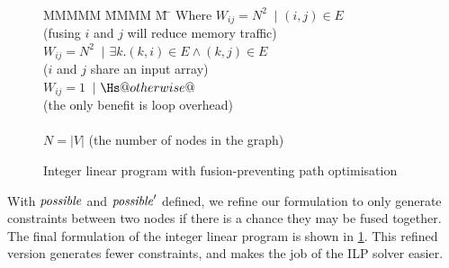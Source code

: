\begin{figure}
\begin{tabbing}
\\[0.5ex]
MMMMM   \= MMMM \= M \= \kill
Where      \> $W_{ij} = N^2$ \> $~|$ \> $(i,j) \in E $         \\
           \> \> \> (fusing $i$ and $j$ will reduce memory traffic)         \\
           \> $W_{ij} = N^2$ \> $~|$ \> $\exists k. (k,i) \in E \wedge (k,j) \in E $     \\
           \> \> \> ($i$ and $j$ share an input array)                                         \\
           \> $W_{ij} = 1$   \> $~|$ \> $\Hs@otherwise@$                                                  \\
           \> \> \> (the only benefit is loop overhead)                                        
\\
\\
           \> $N = |V|$
           \> \> (the number of nodes in the graph)
\end{tabbing}
\caption{Integer linear program with fusion-preventing path optimisation}
\label{fig:clustering:ilp-fpo}
\end{figure}

With $\mathit{possible}$ and $\mathit{possible}'$ defined, we refine our formulation to only generate constraints between two nodes if there is a chance they may be fused together.
The final formulation of the integer linear program is shown in \cref{fig:clustering:ilp-fpo}.
This refined version generates fewer constraints, and makes the job of the ILP solver easier.

% 
